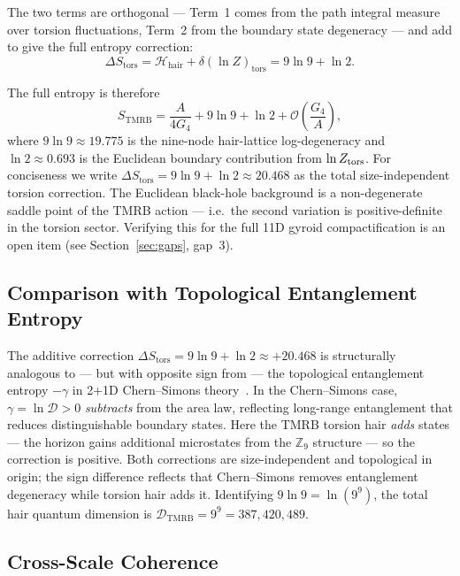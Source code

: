 \documentclass[11pt,a4paper]{article}
\begin{document}
The two terms are orthogonal — Term~1 comes from the path integral measure over
torsion fluctuations, Term~2 from the boundary state degeneracy — and add to
give the full entropy correction:
\begin{equation}
  \Delta S_{\mathrm{tors}} = \mathcal{H}_{\mathrm{hair}} + \delta(\ln Z)_{\mathrm{tors}}
    = 9\ln 9 + \ln 2.
  \label{eq:deltaS_tors}
\end{equation}

The full entropy is therefore
\begin{equation}
  \boxed{S_{\mathrm{TMRB}} = \frac{A}{4G_4} + 9\ln 9 + \ln 2
    + \mathcal{O}\!\left(\frac{G_4}{A}\right),}
  \label{eq:S_TMRB}
\end{equation}
where $9\ln 9 \approx 19.775$ is the nine-node hair-lattice log-degeneracy and
$\ln 2 \approx 0.693$ is the Euclidean boundary contribution from $\ln Z_{\rm tors}$.
For conciseness we write $\Delta S_{\mathrm{tors}} = 9\ln 9 + \ln 2 \approx 20.468$
as the total size-independent torsion correction.  The Euclidean black-hole
background is a non-degenerate saddle point of the TMRB action — i.e.\ the
second variation is positive-definite in the torsion sector.  Verifying this
for the full 11D gyroid compactification is an open item (see
Section~\ref{sec:gaps}, gap~3).

\subsection{Comparison with Topological Entanglement Entropy}

The additive correction $\Delta S_{\mathrm{tors}} = 9\ln 9 + \ln 2 \approx +20.468$
is structurally analogous to — but with opposite sign from — the topological
entanglement entropy $-\gamma$ in 2+1D Chern--Simons
theory~\cite{LevinWen2006,KitaevPreskill2006}.  In the Chern--Simons case,
$\gamma = \ln\mathcal{D} > 0$ \emph{subtracts} from the area law, reflecting
long-range entanglement that reduces distinguishable boundary states.  Here the
TMRB torsion hair \emph{adds} states — the horizon gains additional microstates
from the $\mathbb{Z}_9$ structure — so the correction is positive.  Both
corrections are size-independent and topological in origin; the sign difference
reflects that Chern--Simons removes entanglement degeneracy while torsion hair
adds it.  Identifying $9\ln 9 = \ln(9^9)$, the total hair quantum dimension is
$\mathcal{D}_{\mathrm{TMRB}} = 9^9 = 387{,}420{,}489$.

\subsection{Cross-Scale Coherence}
\end{document}
